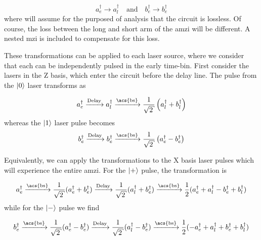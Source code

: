 \begin{equation}
	a^\dagger_e \rightarrow a^\dagger_l \quad \text{and} \quad b^\dagger_e \rightarrow b^\dagger_e
\end{equation}
where will assume for the purposed of analysis that the circuit is lossless. Of course, the loss between the long and short arm of the \ac{amzi} will be different. A nested \ac{mzi} is included to compensate for this loss.

These transformations can be applied to each laser source, where we consider that each can be independently pulsed in the early time-bin. First consider the lasers in the Z basis, which enter the circuit before the delay line. The pulse from the $\ket{0}$ laser transforms as

\begin{equation}
	a^\dagger_e \xrightarrow{\text{Delay}} a^\dagger_l \xrightarrow{\text{\acs{bs}}} \frac{1}{\sqrt{2}}\left(a^\dagger_l + b^\dagger_l\right)
\end{equation}
whereas the $\ket{1}$ laser pulse becomes
\begin{equation}
	b^\dagger_e \xrightarrow{\text{Delay}} b^\dagger_e \xrightarrow{\text{\acs{bs}}} \frac{1}{\sqrt{2}}\left(a^\dagger_e - b^\dagger_e\right)
\end{equation}

Equivalently, we can apply the transformations to the X basis laser pulses which will experience the entire \ac{amzi}. For the $\ket{+}$ pulse, the transformation is




\begin{equation}
	a^\dagger_e \xrightarrow{\text{\acs{bs}}} \frac{1}{\sqrt{2}} (a^\dagger_e + b^\dagger_e) \xrightarrow{\text{Delay}} \frac{1}{\sqrt{2}} (a^\dagger_l + b^\dagger_e) \xrightarrow{\text{\acs{bs}}} \frac{1}{2}(a^\dagger_e + a^\dagger_l - b^\dagger_e + b^\dagger_l)
\end{equation}
while for the $\ket{-}$ pulse we find

\begin{equation}
	b^\dagger_e \xrightarrow{\text{\acs{bs}}} \frac{1}{\sqrt{2}} (a^\dagger_e - b^\dagger_e) \xrightarrow{\text{Delay}} \frac{1}{\sqrt{2}} (a^\dagger_l - b^\dagger_e) \xrightarrow{\text{\acs{bs}}} \frac{1}{2}(- a^\dagger_e + a^\dagger_l + b^\dagger_e + b^\dagger_l)
\end{equation}

